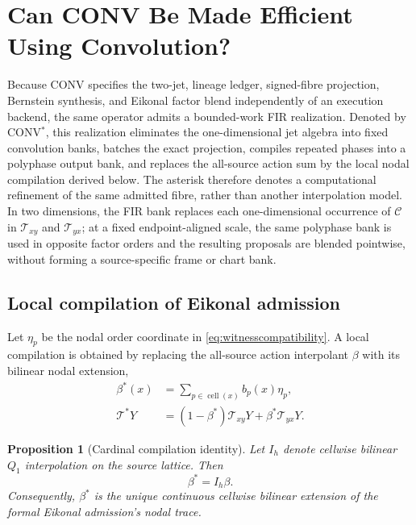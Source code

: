 \documentclass[journal]{IEEEtran}
\newtheorem{proposition}{Proposition}
\newcommand{\Tcal}{\mathcal{T}}
\begin{document}
\section{Can CONV Be Made Efficient Using Convolution?}
\label{sec:convstar}

Because CONV specifies the two-jet, lineage ledger, signed-fibre projection,
Bernstein synthesis, and Eikonal factor blend independently of an execution
backend, the same operator admits a bounded-work FIR realization. Denoted by
CONV$^{*}$, this realization eliminates the one-dimensional jet algebra into
fixed convolution banks, batches the exact projection, compiles repeated
phases into a polyphase output bank, and replaces the all-source action sum by
the local nodal compilation derived below. The asterisk therefore denotes a
computational refinement of the same admitted fibre, rather than another
interpolation model. In two dimensions, the FIR bank replaces each
one-dimensional occurrence of \(\mathcal C\) in \(\Tcal_{xy}\) and
\(\Tcal_{yx}\); at a fixed endpoint-aligned scale, the same polyphase bank is
used in opposite factor orders and the resulting proposals are blended
pointwise, without forming a source-specific frame or chart bank.

\subsection{Local compilation of Eikonal admission}

Let \(\eta_p\) be the nodal order coordinate in
\eqref{eq:witnesscompatibility}. A local compilation is obtained by replacing
the all-source action interpolant \(\beta\) with its bilinear nodal extension,
\begin{align}
 \beta^*(x)&=\sum_{p\in\operatorname{cell}(x)}b_p(x)\eta_p,\nonumber\\
 \Tcal^*Y&=(1-\beta^*)\Tcal_{xy}Y+\beta^*\Tcal_{yx}Y.
 \label{eq:starlocaladmission}
\end{align}
\begin{proposition}[Cardinal compilation identity]
Let \(I_h\) denote cellwise bilinear \(Q_1\) interpolation on the source
lattice. Then
\begin{equation}
 \boxed{\beta^*=I_h\beta.}
 \label{eq:starcardinalcompilation}
\end{equation}
Consequently, \(\beta^*\) is the unique continuous cellwise bilinear extension
of the formal Eikonal admission's nodal trace.
\end{proposition}
\end{document}
